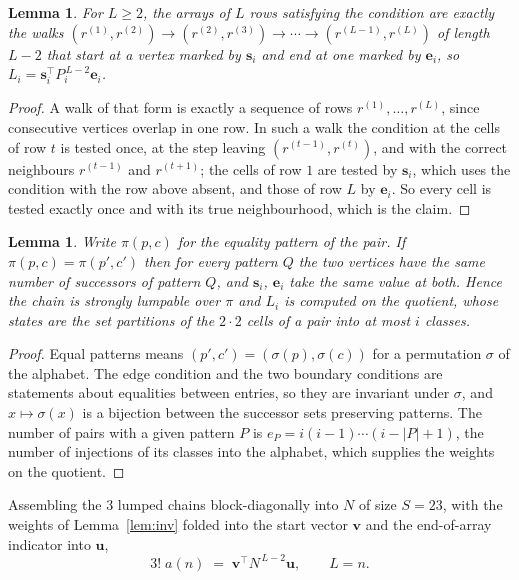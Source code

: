 \documentclass[11pt,a4paper]{article}
\theoremstyle{plain}
\newtheorem{lemma}[theorem]{Lemma}
\theoremstyle{definition}
\begin{document}
\begin{lemma}\label{lem:walk}
For $L\ge2$, the arrays of $L$ rows satisfying the condition are exactly the walks
$(r^{(1)},r^{(2)})\to(r^{(2)},r^{(3)})\to\cdots\to(r^{(L-1)},r^{(L)})$ of length
$L-2$ that start at a vertex marked by $\mathbf{s}_i$ and end at one marked by
$\mathbf{e}_i$, so
$L_i=\mathbf{s}_i^{\!\top}P_i^{\,L-2}\mathbf{e}_i$.
\end{lemma}

\begin{proof}
A walk of that form is exactly a sequence of rows $r^{(1)},\dots,r^{(L)}$, since
consecutive vertices overlap in one row. In such a walk the condition at the cells of
row $t$ is tested once, at the step leaving $(r^{(t-1)},r^{(t)})$, and with the
correct neighbours $r^{(t-1)}$ and $r^{(t+1)}$; the cells of row $1$ are tested by
$\mathbf{s}_i$, which uses the condition with the row above absent, and those of row
$L$ by $\mathbf{e}_i$. So every cell is tested exactly once and with its true
neighbourhood, which is the claim.
\end{proof}

\begin{lemma}\label{lem:lump}
Write $\pi(p,c)$ for the equality pattern of the pair. If $\pi(p,c)=\pi(p',c')$ then for
every pattern $Q$ the two vertices have the same number of successors of pattern $Q$, and
$\mathbf{s}_i$, $\mathbf{e}_i$ take the same value at both. Hence the chain is strongly
lumpable over $\pi$ and $L_i$ is computed on the quotient, whose states are the set
partitions of the $2\cdot2$ cells of a pair into at most $i$ classes.
\end{lemma}

\begin{proof}
Equal patterns means $(p',c')=(\sigma(p),\sigma(c))$ for a permutation $\sigma$ of the
alphabet. The edge condition and the two boundary conditions are statements about equalities
between entries, so they are invariant under $\sigma$, and $x\mapsto\sigma(x)$ is a bijection
between the successor sets preserving patterns. The number of pairs with a given pattern $P$
is $e_P=i(i-1)\cdots(i-|P|+1)$, the number of injections of its classes into the alphabet,
which supplies the weights on the quotient.
\end{proof}

Assembling the $3$ lumped chains block-diagonally into $N$ of size $S=23$, with the
weights of Lemma~\ref{lem:inv} folded into the start vector $\mathbf{v}$ and the
end-of-array indicator into $\mathbf{u}$,
\begin{equation}\label{eq:walk2}
3!\;a(n)\;=\;\mathbf{v}^{\!\top}N^{\,L-2}\mathbf{u},\qquad L=n .
\end{equation}
\end{document}
